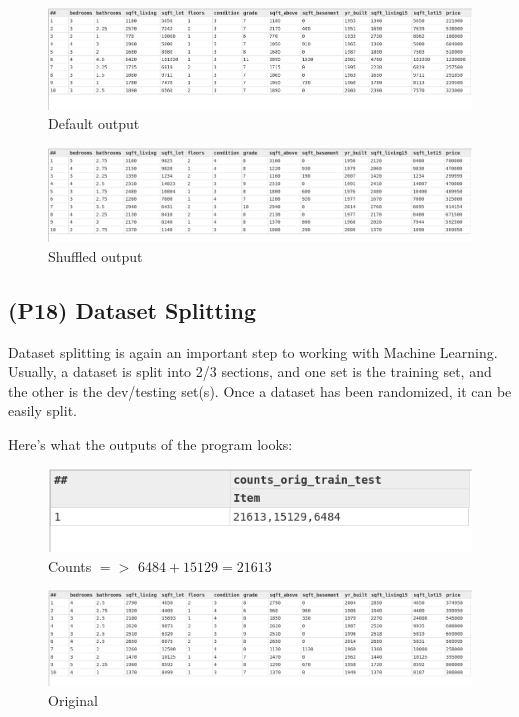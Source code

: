 \begin{figure}[h]
    \centering
    \includegraphics[width=\linewidth]{../output/54/default}
    \caption{Default output}
\end{figure}
\begin{figure}[h]
    \centering
    \includegraphics[width=\linewidth]{../output/54/shuffled}
    \caption{Shuffled output}
\end{figure}


\subsection[Dataset Splitting]{(P18) Dataset Splitting}

Dataset splitting is again an important step to working with Machine Learning. Usually, a dataset is split into 2/3 sections, and one set is the training set, and the other is the dev/testing set(s). Once a dataset has been randomized, it can be easily split.



Here's what the outputs of the program looks:

\begin{figure}[h]
    \centering
    \includegraphics[width=.7\linewidth]{../output/55/counts}
    \caption{Counts $=>$ $6484+15129=21613$}
\end{figure}

\begin{figure}[h]
    \centering
    \includegraphics[width=\linewidth]{../output/55/original}
    \caption{Original}
\end{figure}

